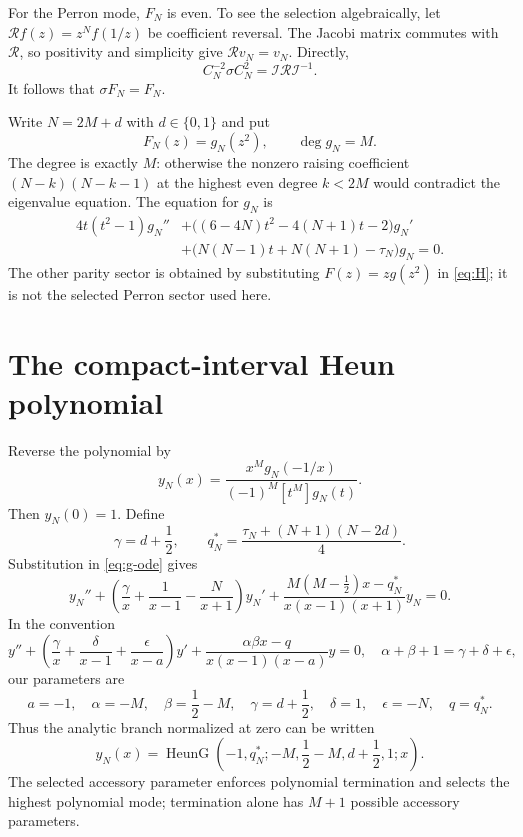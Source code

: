 \documentclass[11pt]{article}
\DeclareMathOperator{\HeunG}{HeunG}
\newcommand{\cI}{\mathcal I}
\begin{document}
For the Perron mode, $F_N$ is even. To see the selection algebraically,
let $\mathcal Rf(z)=z^Nf(1/z)$ be coefficient reversal.
The Jacobi matrix commutes with $\mathcal R$, so positivity and
simplicity give $\mathcal Rv_N=v_N$. Directly,
\[
 C_N^{-2}\sigma C_N^2=\cI\mathcal R\cI^{-1}.
\]
It follows that $\sigma F_N=F_N$.

Write $N=2M+d$ with $d\in\{0,1\}$ and put
\begin{equation}\label{eq:g}
 F_N(z)=g_N(z^2),\qquad \deg g_N=M.
\end{equation}
The degree is exactly $M$: otherwise the nonzero raising coefficient
$(N-k)(N-k-1)$ at the highest even degree $k<2M$ would contradict the
eigenvalue equation. The equation for $g_N$ is
\begin{equation}\label{eq:g-ode}
 \begin{aligned}
 4t(t^2-1)g_N''
 &+\bigl((6-4N)t^2-4(N+1)t-2\bigr)g_N'\\
 &+\bigl(N(N-1)t+N(N+1)-\tau_N\bigr)g_N=0.
 \end{aligned}
\end{equation}
The other parity sector is obtained by substituting $F(z)=z g(z^2)$
in \eqref{eq:H}; it is not the selected Perron sector used here.

\section{The compact-interval Heun polynomial}
Reverse the polynomial by
\begin{equation}\label{eq:y-def}
 y_N(x)=\frac{x^Mg_N(-1/x)}{(-1)^M[t^M]g_N(t)}.
\end{equation}
Then $y_N(0)=1$. Define
\begin{equation}\label{eq:q}
 \gamma=d+\frac12,\qquad
 q_N^*=\frac{\tau_N+(N+1)(N-2d)}4.
\end{equation}
Substitution in \eqref{eq:g-ode} gives
\begin{equation}\label{eq:heun}
 \boxed{y_N''+
 \left(\frac{\gamma}{x}+\frac1{x-1}-\frac N{x+1}\right)y_N'
 +\frac{M(M-\frac12)x-q_N^*}{x(x-1)(x+1)}y_N=0.}
\end{equation}
In the convention
\[
 y''+\left(\frac\gamma x+\frac\delta{x-1}+\frac\epsilon{x-a}\right)y'
 +\frac{\alpha\beta x-q}{x(x-1)(x-a)}y=0,
 \quad \alpha+\beta+1=\gamma+\delta+\epsilon,
\]
our parameters are
\[
 a=-1,\quad \alpha=-M,\quad\beta=\frac12-M,\quad
 \gamma=d+\frac12,\quad\delta=1,\quad\epsilon=-N,\quad q=q_N^*.
\]
Thus the analytic branch normalized at zero can be written
\[
 y_N(x)=\HeunG\left(-1,q_N^*;-M,\frac12-M,d+\frac12,1;x\right).
\]
The selected accessory parameter enforces polynomial termination and
selects the highest polynomial mode; termination alone has $M+1$
possible accessory parameters.
\end{document}
